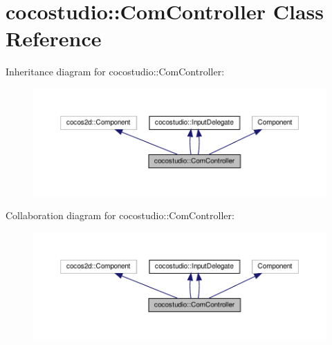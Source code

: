 \hypertarget{classcocostudio_1_1ComController}{}\section{cocostudio\+:\+:Com\+Controller Class Reference}
\label{classcocostudio_1_1ComController}


Inheritance diagram for cocostudio\+:\+:Com\+Controller\+:
\nopagebreak
\begin{figure}[H]
\begin{center}
\leavevmode
\includegraphics[width=350pt]{classcocostudio_1_1ComController__inherit__graph}
\end{center}
\end{figure}


Collaboration diagram for cocostudio\+:\+:Com\+Controller\+:
\nopagebreak
\begin{figure}[H]
\begin{center}
\leavevmode
\includegraphics[width=350pt]{classcocostudio_1_1ComController__coll__graph}
\end{center}
\end{figure}
